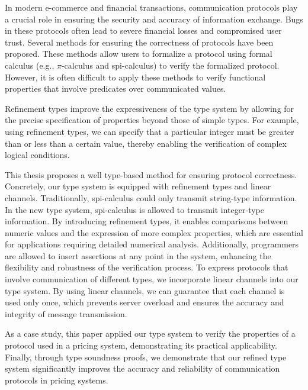\documentclass[master,english]{kuisthesis}
\date{June 12th, 2024}
\theoremstyle{definition}
\begin{document}
\maketitle					%

\begin{eabstract}				%

  In modern e-commerce and financial transactions, communication protocols play a crucial role in ensuring the security and accuracy of information exchange. Bugs in these protocols often lead to severe financial losses and compromised user trust. Several methods for ensuring the correctness of protocols have been proposed. These methods allow users to formalize a protocol using formal calculus (e.g., $\pi$-calculus and spi-calculus) to verify the formalized protocol. However, it is often difficult to apply these methods to verify functional properties that involve predicates over communicated values.





Refinement types improve the expressiveness of the type system by allowing for the precise specification of properties beyond those of simple types. For example, using refinement types, we can specify that a particular integer must be greater than or less than a certain value, thereby enabling the verification of complex logical conditions. 

This thesis proposes a well type-based method for ensuring protocol correctness. Concretely, our type system is equipped with refinement types and linear channels. Traditionally, spi-calculus could only transmit string-type information. In the new type system, spi-calculus is allowed to transmit integer-type information. By introducing refinement types, it enables comparisons between numeric values and the expression of more complex properties, which are essential for applications requiring detailed numerical analysis. Additionally, programmers are allowed to insert assertions at any point in the system, enhancing the flexibility and robustness of the verification process. To express protocols that involve communication of different types, we incorporate linear channels into our type system. By using linear channels, we can guarantee that each channel is used only once, which prevents server overload and ensures the accuracy and integrity of message transmission. 

As a case study, this paper applied our type system to verify the properties of a protocol used in a pricing system, demonstrating its practical applicability. Finally, through type soundness proofs, we demonstrate that our refined type system significantly improves the accuracy and reliability of communication protocols in pricing systems. 





\end{eabstract}
\end{document}
